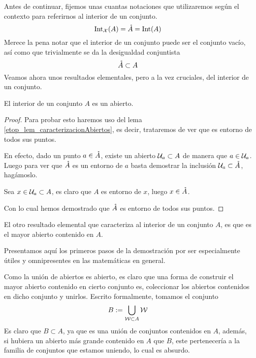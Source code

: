 Antes de continuar, fijemos unas cuantas notaciones que utilizaremos según el contexto para referirnos al interior de un conjunto.
\begin{equation}
\label{etop_eq_notacionInterior}
\operatorname{\mathrm{Int}}_{\mathcal{X}}(A)=\mathring{A}=\operatorname{\mathrm{Int}}(A)
\end{equation}
Merece la pena notar que el interior de un conjunto puede ser el conjunto vacío, así como que trivialmente se da la desigualdad conjuntista
\begin{equation}
\label{etop_eq_desigualdadInterior1}
\mathring{A}\subset A
\end{equation}
Veamos ahora unos resultados elementales, pero a la vez cruciales, del interior de un conjunto.
\begin{lem}[Apertura]
	\label{etop_lem_aperturaInterior}
	El interior de un conjunto $A$ es un abierto.
\end{lem}
\begin{proof}
	Para probar esto haremos uso del lema \ref{etop_lem_caracterizacionAbiertos}, es decir, trataremos de ver que es entorno de todos sus puntos.
	
	En efecto, dado un punto $a\in\mathring{A}$, existe un abierto $\mathcal{U}_a\subset A$ de manera que $a\in\mathcal{U}_a$. Luego para ver que $\mathring{A}$ es un entorno de $a$ basta demostrar la inclusión $\mathcal{U}_a\subset\mathring{A}$, hagámoslo.
	
	Sea $x\in\mathcal{U}_a\subset A$, es claro que $A$ es entorno de $x$, luego $x\in\mathring{A}$.
	
	Con lo cual hemos demostrado que $\mathring{A}$ es entorno de todos sus puntos.
\end{proof}

El otro resultado elemental que caracteriza al interior de un conjunto $A$, es que es el mayor abierto contenido en $A$.

Presentamos aquí los primeros pasos de la demostración por ser especialmente útiles y omnipresentes en las matemáticas en general.

Como la unión de abiertos es abierto, es claro que una forma de construir el mayor abierto contenido en cierto conjunto es, coleccionar los abiertos contenidos en dicho conjunto y unirlos. Escrito formalmente, tomamos el conjunto
\begin{equation}
\label{etop_eq_mayorAbierto}
B:=\bigcup_{\mathcal{W}\subset A}\mathcal{W}
\end{equation}
Es claro que $B\subset A$, ya que es una unión de conjuntos contenidos en $A$, además, si hubiera un abierto más grande contenido en $A$ que $B$, este pertenecería a la familia de conjuntos que estamos uniendo, lo cual es absurdo.

